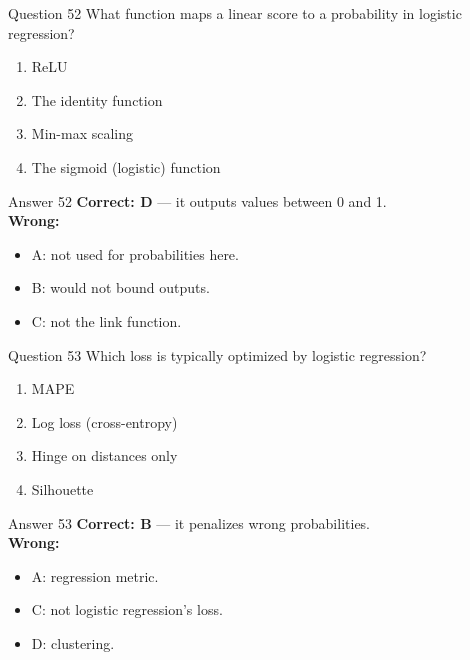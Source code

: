 \documentclass[aspectratio=169,11pt]{beamer}
\begin{document}
\begin{frame}{Question 52}
What function maps a linear score to a probability in logistic regression?
\begin{enumerate}[label=\Alph*.]
\item ReLU
\item The identity function
\item Min-max scaling
\item The sigmoid (logistic) function
\end{enumerate}
\end{frame}
\begin{frame}{Answer 52}
\textbf{Correct: D} --- it outputs values between 0 and 1.\\
\vspace{0.5em}
\textbf{Wrong:}
\begin{itemize}
\item A: not used for probabilities here.
\item B: would not bound outputs.
\item C: not the link function.
\end{itemize}
\end{frame}

\begin{frame}{Question 53}
Which loss is typically optimized by logistic regression?
\begin{enumerate}[label=\Alph*.]
\item MAPE
\item Log loss (cross-entropy)
\item Hinge on distances only
\item Silhouette
\end{enumerate}
\end{frame}
\begin{frame}{Answer 53}
\textbf{Correct: B} --- it penalizes wrong probabilities.\\
\vspace{0.5em}
\textbf{Wrong:}
\begin{itemize}
\item A: regression metric.
\item C: not logistic regression's loss.
\item D: clustering.
\end{itemize}
\end{frame}
\end{document}
